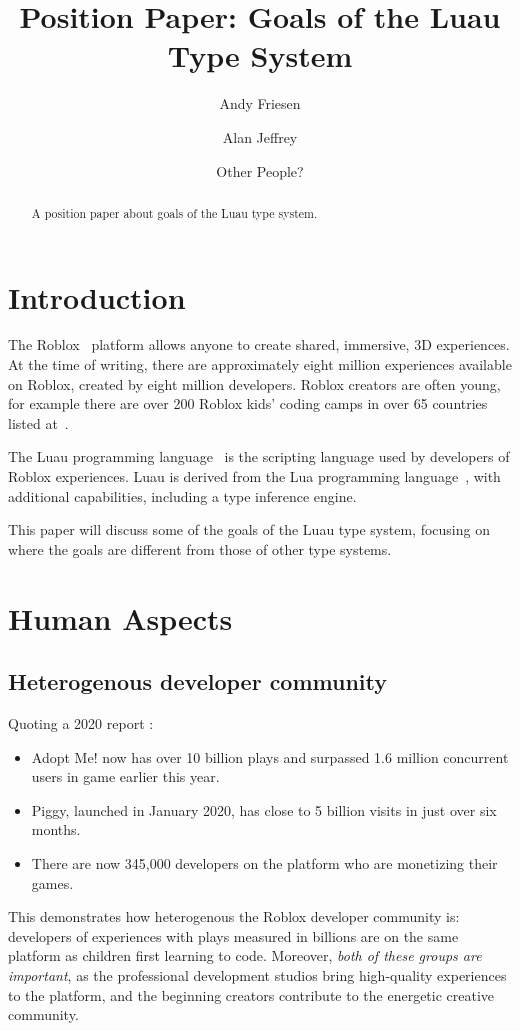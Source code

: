 \documentclass[acmsmall]{acmart}
\begin{document}
\title{Position Paper: Goals of the Luau Type System}

\author{Andy Friesen}
\author{Alan Jeffrey}
\author{Other People?}

\begin{abstract}
  A position paper about goals of the Luau type system.
\end{abstract}

\maketitle

\section{Introduction}

The Roblox~\cite{Roblox} platform allows anyone to create shared,
immersive, 3D experiences.  At the time of writing, there are
approximately eight million experiences available on Roblox, created
by eight million developers.  Roblox creators are often young, for
example there are over 200 Roblox kids' coding camps in over 65 countries
listed at~\cite{AllEducators}.

The Luau programming language~\cite{Luau} is the scripting language
used by developers of Roblox experiences. Luau is derived from the Lua
programming language~\cite{Lua}, with additional capabilities,
including a type inference engine.

This paper will discuss some of the goals of the Luau type system,
focusing on where the goals are different from those of other type systems.

\section{Human Aspects}
\subsection{Heterogenous developer community}

Quoting a 2020 report \cite{RobloxDevelopers}:
\begin{itemize}
\item Adopt Me! now has over 10 billion plays and surpassed 1.6 million concurrent users in game earlier this year.
\item Piggy, launched in January 2020, has close to 5 billion visits in just over six months.
\item There are now 345,000 developers on the platform who are monetizing their games.
\end{itemize}
This demonstrates how heterogenous the Roblox developer community is:
developers of experiences with plays measured in billions are on the same
platform as children first learning to code. Moreover, \emph{both of
these groups are important}, as the professional development studios
bring high-quality experiences to the platform, and the beginning creators
contribute to the energetic creative community.
\end{document}
